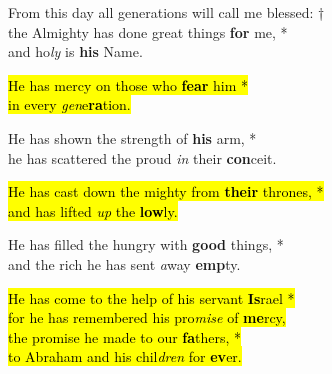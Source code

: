 
From this day all generations will call me blessed: †\\
the Almighty has done great things \textbf{for} me, *\\
and ho\emph{ly} is \textbf{his} Name.

\hl{He has mercy on those who \textbf{fear} him *\\
in every \emph{gen}e\textbf{ra}tion.}

He has shown the strength of \textbf{his} arm, *\\
he has scattered the proud \emph{in} their \textbf{con}ceit.

\hl{He has cast down the mighty from \textbf{their} thrones, *\\
and has lifted \emph{up} the \textbf{low}ly.}

He has filled the hungry with \textbf{good} things, *\\
and the rich he has sent \emph{a}way \textbf{emp}ty.

\hl{He has come to the help of his servant \textbf{Is}rael *\\
for he has remembered his pro\emph{mise} of \textbf{me}rcy,\\
the promise he made to our \textbf{fa}thers, *\\
to Abraham and his chil\emph{dren} for \textbf{ev}er.}